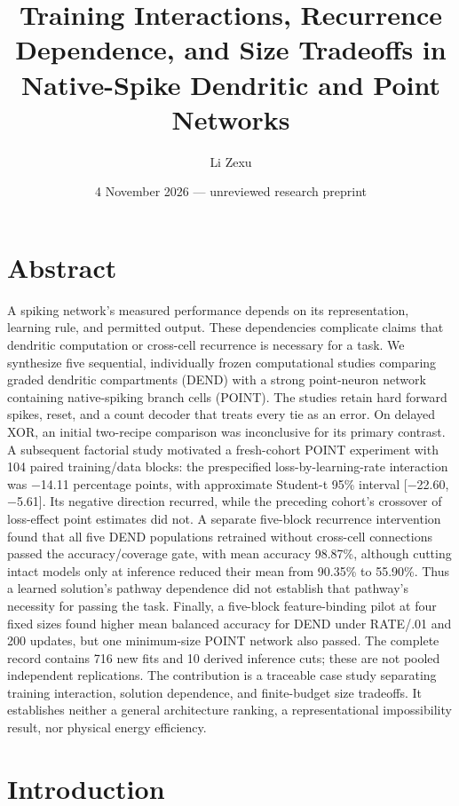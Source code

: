 \documentclass[
  10pt,
]{article}
\title{Training Interactions, Recurrence Dependence, and Size Tradeoffs
in Native-Spike Dendritic and Point Networks}
\author{Li Zexu}
\date{4 November 2026 --- unreviewed research preprint}
\begin{document}
\maketitle

\section{Abstract}\label{abstract}

A spiking network's measured performance depends on its representation,
learning rule, and permitted output. These dependencies complicate
claims that dendritic computation or cross-cell recurrence is necessary
for a task. We synthesize five sequential, individually frozen
computational studies comparing graded dendritic compartments (DEND)
with a strong point-neuron network containing native-spiking branch
cells (POINT). The studies retain hard forward spikes, reset, and a
count decoder that treats every tie as an error. On delayed XOR, an
initial two-recipe comparison was inconclusive for its primary contrast.
A subsequent factorial study motivated a fresh-cohort POINT experiment
with 104 paired training/data blocks: the prespecified
loss-by-learning-rate interaction was −14.11 percentage points, with
approximate Student-t 95\% interval {[}−22.60, −5.61{]}. Its negative
direction recurred, while the preceding cohort's crossover of
loss-effect point estimates did not. A separate five-block recurrence
intervention found that all five DEND populations retrained without
cross-cell connections passed the accuracy/coverage gate, with mean
accuracy 98.87\%, although cutting intact models only at inference
reduced their mean from 90.35\% to 55.90\%. Thus a learned solution's
pathway dependence did not establish that pathway's necessity for
passing the task. Finally, a five-block feature-binding pilot at four
fixed sizes found higher mean balanced accuracy for DEND under RATE/.01
and 200 updates, but one minimum-size POINT network also passed. The
complete record contains 716 new fits and 10 derived inference cuts;
these are not pooled independent replications. The contribution is a
traceable case study separating training interaction, solution
dependence, and finite-budget size tradeoffs. It establishes neither a
general architecture ranking, a representational impossibility result,
nor physical energy efficiency.

\section{Introduction}\label{introduction}
\end{document}
